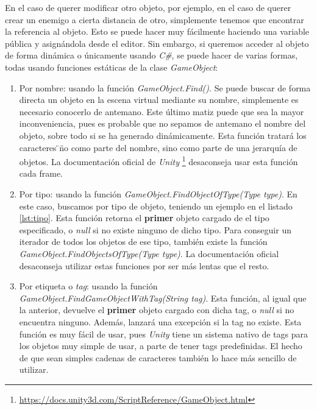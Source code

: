 \documentclass{pre-tfg}
\begin{document}
En el caso de querer modificar otro objeto, por ejemplo, en el caso de querer crear un enemigo a cierta distancia de otro, simplemente tenemos que encontrar la referencia al objeto. Esto se puede hacer muy fácilmente haciendo una variable pública y asignándola desde el editor. Sin embargo, si queremos acceder al objeto de forma dinámica o únicamente usando \textit{C\#}, se puede hacer de varias formas, todas usando funciones estáticas de la clase \textit{GameObject}:

\begin{enumerate}
\item Por nombre: usando la función \textit{GameObject.Find()}. Se puede buscar de forma directa un objeto en la escena virtual mediante su nombre, simplemente es necesario conocerlo de antemano. Este último matiz puede que sea la mayor inconveniencia, pues es probable que no sepamos de antemano el nombre del objeto, sobre todo si se ha generado dinámicamente. Esta función tratará los caracteres \"\/\" no como parte del nombre, sino como parte de una jerarquía de objetos. La documentación oficial de \textit{Unity} \footnote{\url{https://docs.unity3d.com/ScriptReference/GameObject.html}} \cite{unityreference} desaconseja usar esta función cada frame.
\item Por tipo: usando la función \textit{GameObject.FindObjectOfType(Type type)}. En este caso, buscamos por tipo de objeto, teniendo un ejemplo en el listado \ref{lst:tipo}.
 Esta función retorna el \textbf{primer} objeto cargado de el tipo especificado, o \textit{null} si no existe ninguno de dicho tipo. Para conseguir un iterador de todos los objetos de ese tipo, también existe la función \textit{GameObject.FindObjectsOfType(Type type)}. La documentación oficial desaconseja utilizar estas funciones por ser más lentas que el resto.
\item Por etiqueta o \textit{tag}: usando la función \textit{GameObject.FindGameObjectWithTag(String tag)}. Esta función, al igual que la anterior, devuelve el \textbf{primer} objeto cargado con dicha tag, o \textit{null} si no encuentra ninguno. Además, lanzará una excepción si la tag no existe. Esta función es muy fácil de usar, pues \textit{Unity} tiene un sistema nativo de tags para los objetos muy simple de usar, a parte de tener tags predefinidas. El hecho de que sean simples cadenas de caracteres también lo hace más sencillo de utilizar. 
\end{enumerate}
\end{document}
